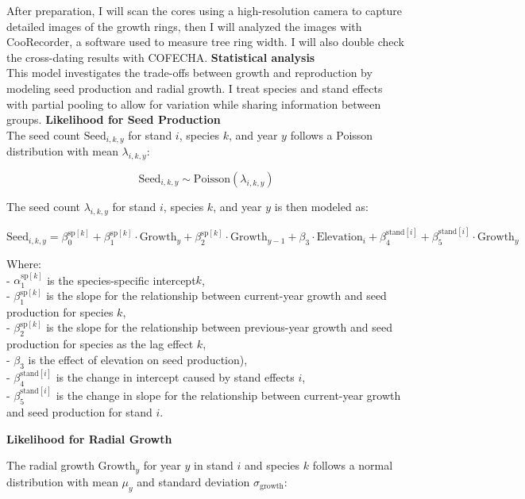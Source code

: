 \documentclass[11pt,letter]{article}
\begin{document}
After preparation, I will scan the cores using a high-resolution camera to capture detailed images of the growth rings, then I will analyzed the images with CooRecorder, a software used to measure tree ring width. I will also double check the cross-dating results with COFECHA.
\textbf{Statistical analysis}\\
This model investigates the trade-offs between growth and reproduction by modeling seed production and radial growth. I treat species and stand effects with partial pooling to allow for variation while sharing information between groups.
\textbf{Likelihood for Seed Production}\\

The seed count \(\text{Seed}_{i,k,y}\) for stand \(i\), species \(k\), and year \(y\) follows a Poisson distribution with mean \(\lambda_{i,k,y}\):

\[
\text{Seed}_{i,k,y} \sim \text{Poisson}(\lambda_{i,k,y})
\]

The seed count \(\lambda_{i,k,y}\) for stand \(i\), species \(k\), and year \(y\) is then modeled as:

\[
\text{Seed}_{i,k,y} = \beta_0^{\text{sp}[k]} + \beta_1^{\text{sp}[k]} \cdot \text{Growth}_y + \beta_2^{\text{sp}[k]} \cdot \text{Growth}_{y-1} + \beta_3 \cdot \text{Elevation}_i + \beta_4^{\text{stand}[i]} + \beta_5^{\text{stand}[i]} \cdot \text{Growth}_y
\]

Where:\\
- \(\alpha_1^{\text{sp}[k]}\) is the species-specific intercept\(k\),\\
- \(\beta_1^{\text{sp}[k]}\) is the slope for the relationship between current-year growth and seed production for species \(k\),\\
- \(\beta_2^{\text{sp}[k]}\) is the slope for the relationship between previous-year growth and seed production for species as the lag effect \(k\),\\
- \(\beta_3\) is the effect of elevation on seed production),\\
- \(\beta_4^{\text{stand}[i]}\) is the change in intercept caused by stand effects \(i\),\\
- \(\beta_5^{\text{stand}[i]}\) is the change in slope for the relationship between current-year growth and seed production for stand \(i\).

\textbf{Likelihood for Radial Growth}

The radial growth \(\text{Growth}_y\) for year \(y\) in stand \(i\) and species \(k\) follows a normal distribution with mean \(\mu_y\) and standard deviation \(\sigma_{\text{growth}}\):
\end{document}
